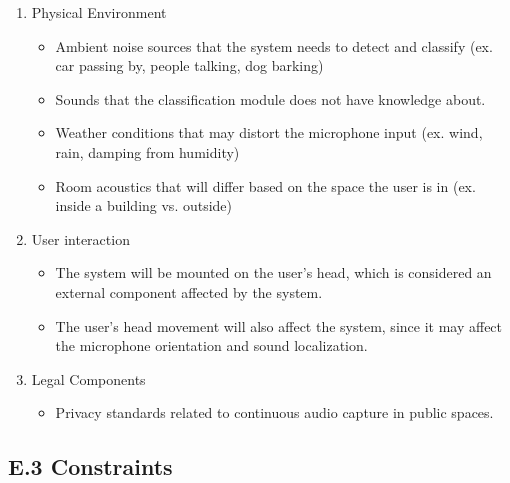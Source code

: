 \documentclass[12pt]{article}
\theoremstyle{definition}
\begin{document}
\begin{enumerate}
  \item Physical Environment
  \begin{itemize}
    \item Ambient noise sources that the system needs to detect and classify
    (ex. car passing by, people talking, dog barking)
    \item Sounds that the classification module does not have knowledge about. 
    \item Weather conditions that may distort the microphone input (ex. wind,
    rain, damping from humidity)
    \item Room acoustics that will differ based on the space the user is in (ex.
    inside a building vs. outside)
  \end{itemize}

  \item User interaction
  \begin{itemize}
    \item The system will be mounted on the user's head, which is considered an
    external component affected by the system.
    \item The user's head movement will also affect the system, since it may
    affect the microphone orientation and sound localization. 
  \end{itemize}

  \item Legal Components
  \begin{itemize}
    \item Privacy standards related to continuous audio capture in public
    spaces. 
  \end{itemize}
\end{enumerate}

\subsection{E.3 Constraints}
\end{document}
